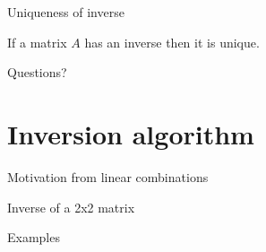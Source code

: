 \documentclass{beamer}
\begin{document}
\begin{frame}{Uniqueness of inverse}
  \begin{lemma}
    If a matrix $A$ has an inverse then it is unique.
  \end{lemma}
\end{frame}

\begin{frame}
  Questions?
\end{frame}

\section{Inversion algorithm}
\label{sec:Inversion-algorithm}

\begin{frame}{Motivation from linear combinations}
  
\end{frame}

\begin{frame}{Inverse of a 2x2 matrix}
  
\end{frame}

\begin{frame}{Examples}
  
\end{frame}
\end{document}
